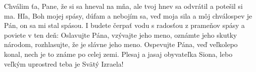 Chválim ťa, Pane, že si sa hneval na mňa,
ale tvoj hnev sa odvrátil a potešil si ma.
\versseparator
Hľa, Boh mojej spásy, dúfam a nebojím sa,
veď moja sila a môj chválospev je Pán,
on sa mi stal spásou.
\versseparator
I budete čerpať vodu s radosťou
z prameňov spásy
\versseparator
a poviete v ten deň:
Oslavujte Pána, vzývajte jeho meno,
oznámte jeho skutky národom,
rozhlasujte, že je slávne jeho meno.
\versseparator
Ospevujte Pána, veď veľkolepo konal,
nech je to známe po celej zemi.
\versseparator
Plesaj a jasaj obyvateľka Siona,
lebo veľkým uprostred teba je Svätý Izraela!
